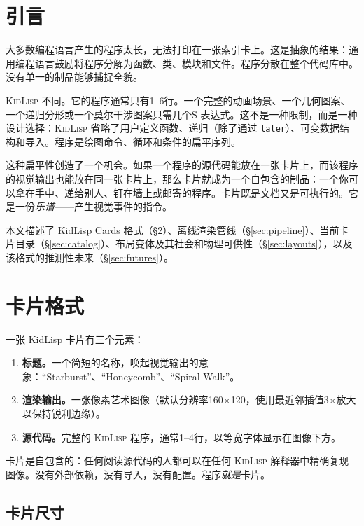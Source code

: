\documentclass[10pt,letterpaper,twocolumn]{article}
\newcommand{\kidlisp}{\textsc{KidLisp}}
\begin{document}

\section{引言}

大多数编程语言产生的程序太长，无法打印在一张索引卡上。这是抽象的结果：通用编程语言鼓励将程序分解为函数、类、模块和文件。程序分散在整个代码库中。没有单一的制品能够捕捉全貌。

\kidlisp{} 不同。它的程序通常只有1--6行。一个完整的动画场景、一个几何图案、一个递归分形或一个莫尔干涉图案只需几个S-表达式。这不是一种限制，而是一种设计选择：\kidlisp{} 省略了用户定义函数、递归（除了通过 \texttt{later}）、可变数据结构和导入。程序是绘图命令、循环和条件的扁平序列。

这种扁平性创造了一个机会。如果一个程序的源代码能放在一张卡片上，而该程序的视觉输出也能放在同一张卡片上，那么卡片就成为一个自包含的制品：一个你可以拿在手中、递给别人、钉在墙上或邮寄的程序。卡片既是文档又是可执行的。它是一份\emph{乐谱}------产生视觉事件的指令。

本文描述了 KidLisp Cards 格式（\S\ref{sec:format}）、离线渲染管线（\S\ref{sec:pipeline}）、当前卡片目录（\S\ref{sec:catalog}）、布局变体及其社会和物理可供性（\S\ref{sec:layouts}），以及该格式的推测性未来（\S\ref{sec:futures}）。


\section{卡片格式}
\label{sec:format}

一张 KidLisp 卡片有三个元素：

\begin{enumerate}
  \item \textbf{标题。}一个简短的名称，唤起视觉输出的意象：``Starburst''、``Honeycomb''、``Spiral Walk''。
  \item \textbf{渲染输出。}一张像素艺术图像（默认分辨率160$\times$120，使用最近邻插值3$\times$放大以保持锐利边缘）。
  \item \textbf{源代码。}完整的 \kidlisp{} 程序，通常1--4行，以等宽字体显示在图像下方。
\end{enumerate}

卡片是自包含的：任何阅读源代码的人都可以在任何 \kidlisp{} 解释器中精确复现图像。没有外部依赖，没有导入，没有配置。程序\emph{就是}卡片。

\subsection{卡片尺寸}
\end{document}
